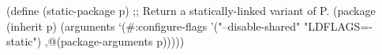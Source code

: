 \documentclass{beamer}
\begin{document}
\begin{frame}[fragile]{}
  \begin{semiverbatim}
(define (static-package p)
  ;; Return a statically-linked variant of P.
  (package (\alert{inherit} p)
    (arguments
     `(\#:configure-flags '("--disable-shared"
                            "LDFLAGS=-static")
       ,@(package-arguments p)))))
  \end{semiverbatim}
\end{frame}




\end{document}

